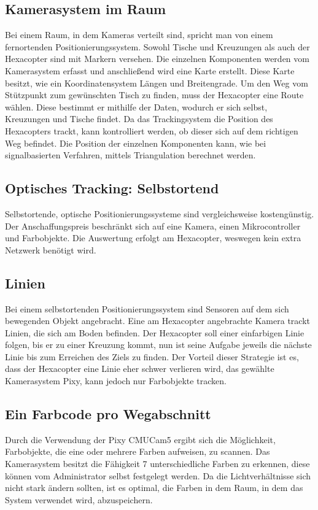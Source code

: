   \subsection*{Kamerasystem im Raum}
  Bei einem Raum, in dem Kameras verteilt sind, spricht man von einem fernortenden Positionierungssystem.
  Sowohl Tische und Kreuzungen als auch der Hexacopter sind mit Markern versehen. Die einzelnen Komponenten werden vom Kamerasystem erfasst und anschließend wird eine Karte erstellt. Diese Karte besitzt, wie ein Koordinatensystem Längen und Breitengrade.
  Um den Weg vom Stützpunkt zum gewünschten Tisch zu finden, muss der Hexacopter eine Route wählen. Diese bestimmt er mithilfe der Daten, wodurch er sich selbst, Kreuzungen und Tische findet. Da das Trackingsystem die Position des Hexacopters trackt, kann kontrolliert werden, ob dieser sich auf dem richtigen Weg befindet. Die Position der einzelnen Komponenten kann, wie bei signalbasierten Verfahren, mittels Triangulation berechnet werden.

  \subsection{Optisches Tracking: Selbstortend}
  Selbstortende, optische Positionierungssysteme sind vergleichsweise kostengünstig. Der Anschaffungspreis beschränkt sich auf eine Kamera, einen Mikrocontroller und Farbobjekte. Die Auswertung erfolgt am Hexacopter, weswegen kein extra Netzwerk benötigt wird.

  \subsection*{Linien}
  Bei einem selbstortenden Positionierungssystem sind Sensoren auf dem sich bewegenden Objekt angebracht.
  Eine am Hexacopter angebrachte Kamera trackt Linien, die sich am Boden befinden. Der Hexacopter soll einer einfarbigen Linie folgen, bis er zu einer Kreuzung kommt, nun ist seine Aufgabe jeweils die nächste Linie bis zum Erreichen des Ziels zu finden. Der Vorteil dieser Strategie ist es, dass der Hexacopter eine Linie eher schwer verlieren wird, das gewählte Kamerasystem Pixy, kann jedoch nur Farbobjekte tracken.

  \subsection*{Ein Farbcode pro Wegabschnitt}
  Durch die Verwendung der Pixy CMUCam5 ergibt sich die Möglichkeit, Farbobjekte, die eine oder mehrere Farben aufweisen, zu scannen.
  Das Kamerasystem besitzt die Fähigkeit 7 unterschiedliche Farben zu erkennen, diese können vom Administrator selbst festgelegt werden. Da die Lichtverhältnisse sich nicht stark ändern sollten, ist es optimal, die Farben in dem Raum, in dem das System verwendet wird, abzuspeichern.

